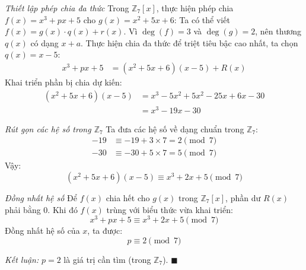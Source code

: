 \begin{solution}
\textit{Thiết lập phép chia đa thức}
Trong $\mathbb{Z}_7[x]$, thực hiện phép chia $f(x) = x^3 + px + 5$ cho $g(x) = x^2 + 5x + 6$:
Ta có thể viết $f(x) = g(x) \cdot q(x) + r(x)$.
Vì $\deg(f) = 3$ và $\deg(g) = 2$, nên thương $q(x)$ có dạng $x + a$.
Thực hiện chia đa thức để triệt tiêu bậc cao nhất, ta chọn $q(x) = x - 5$:
\begin{align*}
    x^3 + px + 5 &= (x^2 + 5x + 6)(x - 5) + R(x)
\end{align*}
Khai triển phần bị chia dự kiến:
\begin{align*}
    (x^2 + 5x + 6)(x - 5) &= x^3 - 5x^2 + 5x^2 - 25x + 6x - 30 \\
    &= x^3 - 19x - 30
\end{align*}

\textit{Rút gọn các hệ số trong $\mathbb{Z}_7$}
Ta đưa các hệ số về dạng chuẩn trong $\mathbb{Z}_7$:
\begin{align*}
    -19 &\equiv -19 + 3 \times 7 = 2 \pmod 7 \\
    -30 &\equiv -30 + 5 \times 7 = 5 \pmod 7
\end{align*}
Vậy:
\[
    (x^2 + 5x + 6)(x - 5) \equiv x^3 + 2x + 5 \pmod 7
\]

\textit{Đồng nhất hệ số}
Để $f(x)$ chia hết cho $g(x)$ trong $\mathbb{Z}_7[x]$, phần dư $R(x)$ phải bằng 0. 
Khi đó $f(x)$ trùng với biểu thức vừa khai triển:
\[
    x^3 + px + 5 \equiv x^3 + 2x + 5 \pmod 7
\]
Đồng nhất hệ số của $x$, ta được:
\[
    p \equiv 2 \pmod 7
\]

\textit{Kết luận:} $p = 2$ là giá trị cần tìm (trong $\mathbb{Z}_7$). $\blacksquare$
\end{solution}

\newpage
